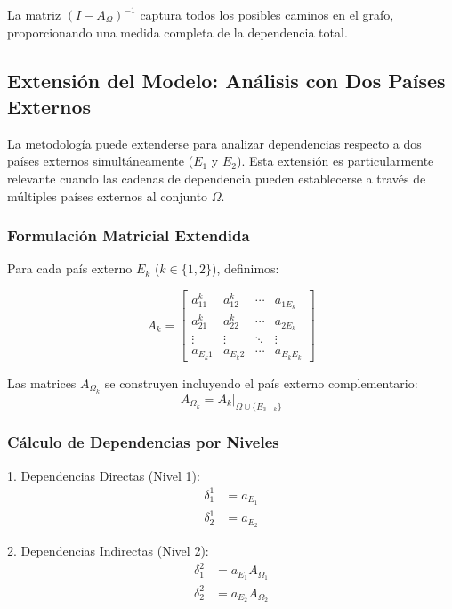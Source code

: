 \documentclass[5p,authoryear]{elsarticle}
\begin{document}
La matriz $(I - A_\Omega)^{-1}$ captura todos los posibles caminos en el grafo, proporcionando una medida completa de la dependencia total.

\subsection{Extensión del Modelo: Análisis con Dos Países Externos}

La metodología puede extenderse para analizar dependencias respecto a dos países externos simultáneamente ($E_1$ y $E_2$). Esta extensión es particularmente relevante cuando las cadenas de dependencia pueden establecerse a través de múltiples países externos al conjunto $\Omega$.

\subsubsection{Formulación Matricial Extendida}

Para cada país externo $E_k$ ($k \in \{1,2\}$), definimos:

\begin{equation}
    A_k =
    \begin{bmatrix}
    a_{11}^k & a_{12}^k & \cdots & a_{1E_k} \\
    a_{21}^k & a_{22}^k & \cdots & a_{2E_k} \\
    \vdots & \vdots & \ddots & \vdots \\
    a_{E_k1} & a_{E_k2} & \cdots & a_{E_kE_k}
    \end{bmatrix}
\end{equation}

Las matrices $A_{\Omega_k}$ se construyen incluyendo el país externo complementario:
\begin{equation}
    A_{\Omega_k} = A_k|_{\Omega \cup \{E_{3-k}\}}
\end{equation}

\subsubsection{Cálculo de Dependencias por Niveles}

1. Dependencias Directas (Nivel 1):
\begin{align}
    \delta_1^1 &= a_{E_1} \\
    \delta_2^1 &= a_{E_2}
\end{align}

2. Dependencias Indirectas (Nivel 2):
\begin{align}
    \delta_1^2 &= a_{E_1}A_{\Omega_1} \\
    \delta_2^2 &= a_{E_2}A_{\Omega_2}
\end{align}
\end{document}
